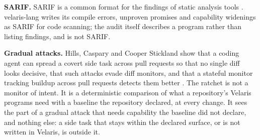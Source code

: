 \documentclass[
]{article}
\begin{document}
\textbf{SARIF.} SARIF is a common format for the findings of static
analysis tools \citep{sarif2020}. velaris-lang writes its compile
errors, unproven promises and capability widenings as SARIF for code
scanning; the audit itself describes a program rather than listing
findings, and is not SARIF.

\textbf{Gradual attacks.} Hills, Caspary and Cooper Stickland show that
a coding agent can spread a covert side task across pull requests so
that no single diff looks decisive, that such attacks evade diff
monitors, and that a stateful monitor tracking buildup across pull
requests detects them better \citep{hills2026distributed}. The ratchet
is not a monitor of intent. It is a deterministic comparison of what a
repository's Velaris programs need with a baseline the repository
declared, at every change. It sees the part of a gradual attack that
needs capability the baseline did not declare, and nothing else: a side
task that stays within the declared surface, or is not written in
Velaris, is outside it.
\end{document}
